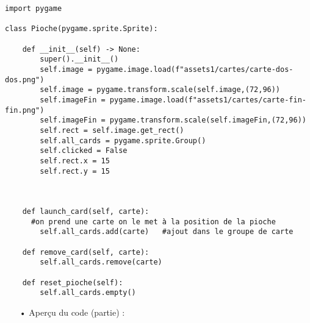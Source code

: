 	\begin{lstlisting}
import pygame

class Pioche(pygame.sprite.Sprite):

    def __init__(self) -> None:
        super().__init__()
        self.image = pygame.image.load(f"assets1/cartes/carte-dos-dos.png")
        self.image = pygame.transform.scale(self.image,(72,96))
        self.imageFin = pygame.image.load(f"assets1/cartes/carte-fin-fin.png")
        self.imageFin = pygame.transform.scale(self.imageFin,(72,96))
        self.rect = self.image.get_rect()
        self.all_cards = pygame.sprite.Group()
        self.clicked = False
        self.rect.x = 15
        self.rect.y = 15



    def launch_card(self, carte):
      #on prend une carte on le met à la position de la pioche
        self.all_cards.add(carte)   #ajout dans le groupe de carte

    def remove_card(self, carte):
        self.all_cards.remove(carte)

    def reset_pioche(self):
        self.all_cards.empty()
	\end{lstlisting}
	
	\begin{itemize}
	\color{blue}\item[•]Aperçu du code (partie) :
	\end{itemize}
	
